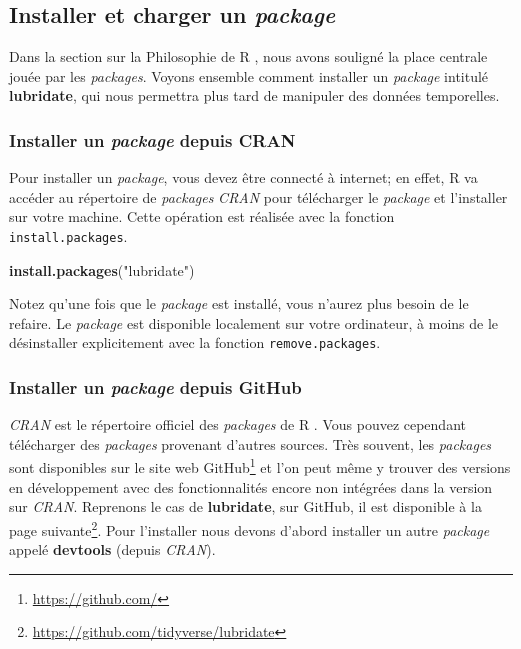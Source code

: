 \documentclass[
  11pt,
  french,
]{book}
\makeatletter
\newenvironment{Shaded}{\begin{snugshade}}{\end{snugshade}}
\newcommand{\KeywordTok}[1]{\textcolor[rgb]{0.13,0.29,0.53}{\textbf{#1}}}
\newcommand{\NormalTok}[1]{#1}
\newcommand{\StringTok}[1]{\textcolor[rgb]{0.31,0.60,0.02}{#1}}
\renewcommand{\href}[2]{#2\footnote{\url{#1}}}
\newenvironment{kframe}{%
\medskip{}
\setlength{\fboxsep}{.8em}
 \def\at@end@of@kframe{}%
 \ifinner\ifhmode%
  \def\at@end@of@kframe{\end{minipage}}%
  \begin{minipage}{\columnwidth}%
 \fi\fi%
 \def\FrameCommand##1{\hskip\@totalleftmargin \hskip-\fboxsep
 \colorbox{shadecolor}{##1}\hskip-\fboxsep
     \hskip-\linewidth \hskip-\@totalleftmargin \hskip\columnwidth}%
 \MakeFramed {\advance\hsize-\width
   \@totalleftmargin\z@ \linewidth\hsize
   \@setminipage}}%
 {\par\unskip\endMakeFramed%
 \at@end@of@kframe}
\renewenvironment{Shaded}{\begin{kframe}}{\end{kframe}}
\makeatother
\begin{document}
\hypertarget{sect0123}{%
\subsection{\texorpdfstring{Installer et charger un \emph{package}}{Installer et charger un package}}\label{sect0123}}

Dans la section sur la Philosophie de R , nous avons souligné la place centrale jouée par les \emph{packages}. Voyons ensemble comment installer un \emph{package} intitulé \textbf{lubridate}, qui nous permettra plus tard de manipuler des données temporelles.

\hypertarget{sect01231}{%
\subsubsection{\texorpdfstring{Installer un \emph{package} depuis CRAN}{Installer un package depuis CRAN}}\label{sect01231}}

Pour installer un \emph{package}, vous devez être connecté à internet; en effet, R va accéder au répertoire de \emph{packages} \emph{CRAN} pour télécharger le \emph{package} et l'installer sur votre machine. Cette opération est réalisée avec la fonction \texttt{install.packages}.

\begin{Shaded}
\begin{Highlighting}[]
\KeywordTok{install.packages}\NormalTok{(}\StringTok{"lubridate"}\NormalTok{)}
\end{Highlighting}
\end{Shaded}

Notez qu'une fois que le \emph{package} est installé, vous n'aurez plus besoin de le refaire. Le \emph{package} est disponible localement sur votre ordinateur, à moins de le désinstaller explicitement avec la fonction \texttt{remove.packages}.

\hypertarget{sect01232}{%
\subsubsection{\texorpdfstring{Installer un \emph{package} depuis GitHub}{Installer un package depuis GitHub}}\label{sect01232}}

\emph{CRAN} est le répertoire officiel des \emph{packages} de R . Vous pouvez cependant télécharger des \emph{packages} provenant d'autres sources. Très souvent, les \emph{packages} sont disponibles sur le site web \href{https://github.com/}{GitHub} et l'on peut même y trouver des versions en développement avec des fonctionnalités encore non intégrées dans la version sur \emph{CRAN}. Reprenons le cas de \textbf{lubridate}, sur GitHub, il est disponible à la page \href{https://github.com/tidyverse/lubridate}{suivante}. Pour l'installer nous devons d'abord installer un autre \emph{package} appelé \textbf{devtools} (depuis \emph{CRAN}).
\end{document}
